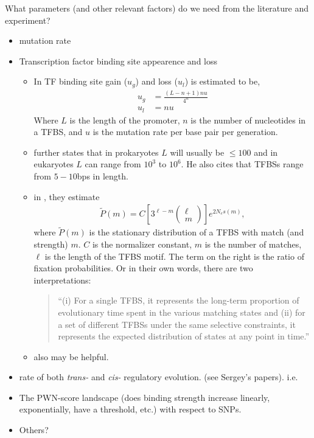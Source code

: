 \documentclass[11 pt]{article}
\begin{document}
What parameters (and other relevant factors) do we need from the literature and experiment? 
  \begin{itemize}
    \item mutation rate
    \item Transcription factor binding site appearence and loss
    \begin{itemize}
      \item In \citep{lynch2007evolution} TF binding site gain ($u_{g}$) and loss ($u_{l}$) is estimated to be,
        \begin{align*}
          u_{g} &= \frac{(L-n+1)nu}{4^{n}} \\
          u_{l} &= nu
        \end{align*}
      Where $L$ is the length of the promoter, $n$ is the number of nucleotides in a TFBS, and $u$ is the mutation rate per base pair per generation. 
    \item \citet{lynch2007evolution} further states that in prokaryotes $L$ will usually be $\leq 100$ and in eukaryotes $L$ can range from $10^{3}$ to $10^{6}$. He also cites \citep{harbison2004transcriptional} that TFBSs range from $5-10$bps in length.
    \item in \citep{lynch2014evolutionary}, they estimate
        \begin{align*}
          \tilde{P}(m) = C \left[ 3^{\ell - m}  \left( \begin{array}{c} \ell \\ m \end{array} \right) \right] e^{2N_{e}s(m)}  ,
        \end{align*}
        where $\tilde{P}(m)$ is the stationary distribution of a TFBS with match (and strength) $m$. $C$ is the normalizer constant, $m$ is the number of matches, $\ell$ is the length of the TFBS motif. The term on the right is the ratio of fixation probabilities. 
        Or in their own words, there are two interpretations: 
        \begin{quote} ``(i) For a single TFBS, it represents the long-term proportion of evolutionary time spent in the various matching states and (ii) for a set of different TFBSs under the same selective constraints, it represents the expected distribution of states at any point in time.'' \end{quote}
      \item \citet{tuugrul2015dynamics, anderson2015intermolecular} also may be helpful.
    \end{itemize}
    \item rate of both \emph{trans-} and \emph{cis-} regulatory evolution. (see Sergey's papers).
      i.e. \citep{nuzhdin2004common, fear2016buffering, graze2009regulatory, graze2012allelic, genissel2008cis}
    \item The PWN-score landscape (does binding strength increase linearly, exponentially, have a threshold, etc.) with respect to SNPs.
    \item Others? 
  \end{itemize}
\end{document}
